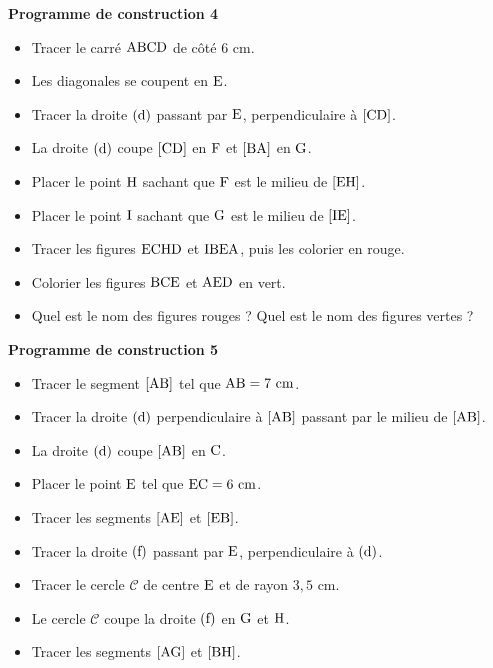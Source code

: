 \documentclass{article}
\begin{document}
\noindent\textbf{Programme de construction 4}\par\smallskip\noindent
\begin{itemize}
    \item Tracer le carré $\text{ABCD}$ de côté $6\text{ cm}$.
    \item Les diagonales se coupent en $\text{E}$.
    \item Tracer la droite $(\text{d})$ passant par $\text{E}$,
    perpendiculaire à $[\text{CD}]$.
    \item La droite $(\text{d})$ coupe $[\text{CD}]$ en
    $\text{F}$ et $[\text{BA}]$ en $\text{G}$.
    \item Placer le point $\text{H}$ sachant que $\text{F}$ est
    le milieu de $[\text{EH}]$.
    \item Placer le point $\text{I}$ sachant que $\text{G}$ est
    le milieu de $[\text{IE}]$.
    \item Tracer les figures $\text{ECHD}$ et $\text{IBEA}$,
    puis les colorier en rouge.
    \item Colorier les figures $\text{BCE}$ et $\text{AED}$ en
    vert.
    \item Quel est le nom des figures rouges ? Quel est le nom des figures
    vertes ?
\end{itemize}
\noindent\textbf{Programme de construction 5}\par\smallskip\noindent
\begin{itemize}
    \item Tracer le segment $[\text{AB}]$ tel que
    $\text{AB}=7\text{ cm}$.
    \item Tracer la droite $(\text{d})$ perpendiculaire à
    $[\text{AB}]$ passant par le milieu de $[\text{AB}]$.
    \item La droite $(\text{d})$ coupe $[\text{AB}]$ en
    $\text{C}$.
    \item Placer le point $\text{E}$ tel que $\text{EC}=6\text{ cm}$.
    \item Tracer les segments $[\text{AE}]$ et $[\text{EB}]$.
    \item Tracer la droite $(\text{f})$ passant par $\text{E}$,
    perpendiculaire à $(\text{d})$.
    \item Tracer le cercle $\mathcal{C}$ de centre $\text{E}$ et de
    rayon $3{,}5\text{ cm}$.
    \item Le cercle $\mathcal{C}$ coupe la droite $(\text{f})$ en
    $\text{G}$ et $\text{H}$.
    \item Tracer les segments $[\text{AG}]$ et $[\text{BH}]$.
\end{itemize}
\end{document}
